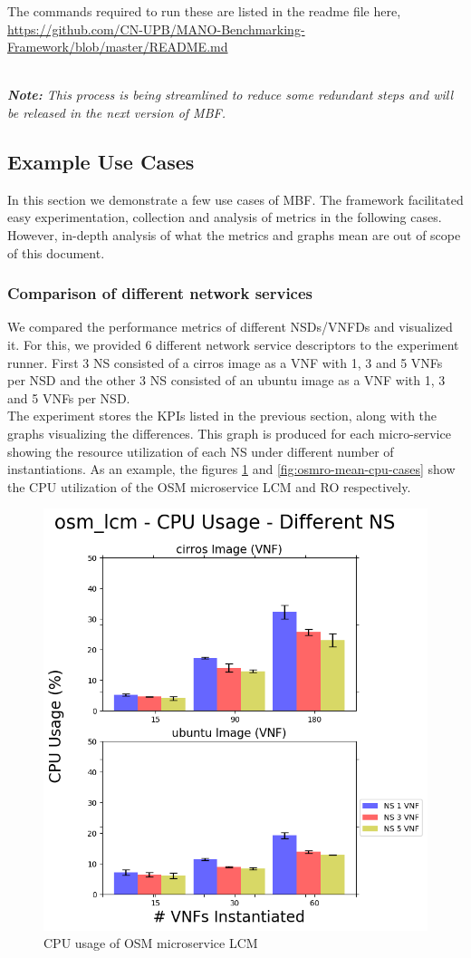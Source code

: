 The commands required to run these are listed in the readme file here, \\ \url{https://github.com/CN-UPB/MANO-Benchmarking-Framework/blob/master/README.md}

\textit{\\\textbf{Note:} This process is being streamlined to reduce some redundant steps and will be released in the next version of MBF.} 

\subsection{Example Use Cases}

In this section we demonstrate a few use cases of MBF. 
The framework facilitated easy experimentation, collection and analysis of metrics in the following cases. 
However, in-depth analysis of what the metrics and graphs mean are out of scope of this document. 



\subsubsection{Comparison of different network services} 

We compared the performance metrics of different NSDs/VNFDs and visualized it. 
For this, we provided 6 different network service descriptors to the experiment runner. 
First 3 NS consisted of a cirros image as a VNF with 1, 3 and 5 VNFs per NSD and the other 3 NS consisted of an ubuntu image as a VNF with 1, 3 and 5 VNFs per NSD.\\

The experiment stores the KPIs listed in the previous section, along with the graphs visualizing the differences. 
This graph is produced for each micro-service showing the resource utilization of each NS under different number of instantiations. 
As an example, the figures \ref{fig:osmlcm-mean-cpu-cases} and \ref{fig:osmro-mean-cpu-cases} show the CPU utilization of the OSM microservice LCM and RO respectively.

\begin{figure}[h]
	\centering
	\includegraphics[width=0.6\linewidth]{figures/scalability_graphs/Docker-Grouped-Cases/osm/osm_lcm-Mean-CPU-Cases}
	\caption{CPU usage of OSM microservice LCM}
	\label{fig:osmlcm-mean-cpu-cases}
\end{figure}

